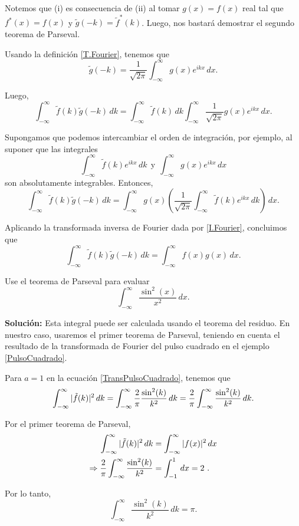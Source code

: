 \begin{demo}
Notemos que (i) es consecuencia de (ii) al tomar $g(x) = f(x)$ real tal que $f^*(x) = f(x)$ y $\tilde{g}(-k) = \tilde{f}^*(k)$. Luego, nos bastará demostrar el segundo teorema de Parseval.

Usando la definición \eqref{T.Fourier}, tenemos que 
$$\tilde{g}(-k) = \frac{1}{\sqrt{2\pi}} \int_{-\infty}^{\infty} g(x) e^{ikx} \,dx.$$

Luego, 
$$\int_{-\infty}^{\infty} \tilde{f}(k) \tilde{g}(-k) \,dk = \int_{-\infty}^{\infty} \tilde{f}(k) \,dk \int_{-\infty}^{\infty} \frac{1}{\sqrt{2\pi}} g(x) e^{ikx} \,dx.$$

Supongamos que podemos intercambiar el orden de integración, por ejemplo, al suponer que las integrales 
$$\int_{-\infty}^{\infty} \tilde{f}(k) e^{ikx} \,dk ~~\mbox{y}~~ \int_{-\infty}^{\infty} g(x) e^{ikx} \,dx$$
son absolutamente integrables. Entonces,
$$\int_{-\infty}^{\infty} \tilde{f}(k) \tilde{g}(-k) \,dk = \int_{-\infty}^{\infty} g(x) \left( \frac{1}{\sqrt{2\pi}} \int_{-\infty}^{\infty} \tilde{f}(k) e^{ikx} \,dk\right) \,dx.$$

Aplicando la transformada inversa de Fourier dada por \eqref{I.Fourier}, concluimos que
$$\int_{-\infty}^{\infty} \tilde{f}(k) \tilde{g}(-k) \,dk = \int_{-\infty}^{\infty} f(x) g(x)  \,dx.$$

\end{demo}

\begin{ejemplo}
    Use el teorema de Parseval para evaluar
    $$\int_{-\infty}^{\infty}  \frac{\sin^2(x)}{x^2} \,dx.$$

    \textbf{Solución:} Esta integral puede ser calculada usando el teorema del residuo. En nuestro caso, usaremos el primer teorema de Parseval, teniendo en cuenta el resultado de la transformada de Fourier del pulso cuadrado en el ejemplo \ref{PulsoCuadrado}. 

    Para $a = 1$ en la ecuación \eqref{TransPulsoCuadrado}, tenemos que
    $$\int_{- \infty}^{\infty} |\Tilde{f}(k)|^2 \,dk = \int_{- \infty}^{\infty} \frac{2}{\pi} \frac{\sin^2(k)}{k^2}  \,dk = \frac{2}{\pi} \int_{-\infty}^{\infty}  \frac{\sin^2(k)}{k^2} \,dk.$$

    Por el primer teorema de Parseval,
    \begin{align*}
        \int_{- \infty}^{\infty} |\Tilde{f}(k)|^2 \,dk &= \int_{-\infty}^{\infty} |f(x)|^2 \,dx \\
        \Rightarrow \frac{2}{\pi} \int_{-\infty}^{\infty}  \frac{\sin^2(k)}{k^2} &=  \int_{-1}^1 \,dx = 2 \ . 
    \end{align*}

Por lo tanto,
$$\int_{-\infty}^{\infty}  \frac{\sin^2(k)}{k^2} \,dk = \pi.$$
\end{ejemplo}

